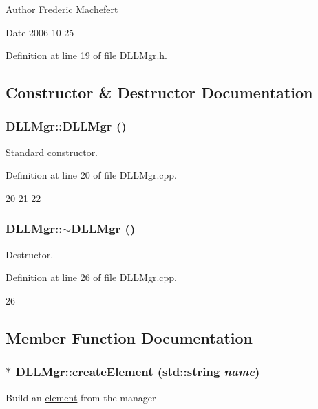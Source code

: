 \begin{DoxyAuthor}{Author}
Frederic Machefert 
\end{DoxyAuthor}
\begin{DoxyDate}{Date}
2006-\/10-\/25 
\end{DoxyDate}


Definition at line 19 of file DLLMgr.h.

\subsection{Constructor \& Destructor Documentation}
\hypertarget{classDLLMgr_a3751927270f2acc954d9171e1f109876}{
\subsubsection[{DLLMgr}]{\setlength{\rightskip}{0pt plus 5cm}DLLMgr::DLLMgr ()}}
\label{classDLLMgr_a3751927270f2acc954d9171e1f109876}


Standard constructor. 

Definition at line 20 of file DLLMgr.cpp.


\begin{DoxyCode}
20                  {
21 
22 }
\end{DoxyCode}
\hypertarget{classDLLMgr_a80e79a573af874023318064ad9d32e74}{
\subsubsection[{$\sim$DLLMgr}]{\setlength{\rightskip}{0pt plus 5cm}DLLMgr::$\sim$DLLMgr ()}}
\label{classDLLMgr_a80e79a573af874023318064ad9d32e74}


Destructor. 

Definition at line 26 of file DLLMgr.cpp.


\begin{DoxyCode}
26 {} 
\end{DoxyCode}


\subsection{Member Function Documentation}
\hypertarget{classDLLMgr_a8cc61eaf98a6aa3cb99fee7226477053}{
\subsubsection[{createElement}]{ $\ast$ DLLMgr::createElement (std::string {\em name})}}
\label{classDLLMgr_a8cc61eaf98a6aa3cb99fee7226477053}
Build an \hyperlink{namespaceelement}{element} from the manager 

